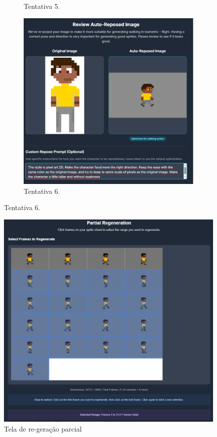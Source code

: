 \begin{figure}[htbp]
\begin{subfigure}{0.45\linewidth}
        \caption{\small Tentativa 5.}
        \label{fig:godmodAIrepose5}
    \end{subfigure}
        \begin{subfigure}{0.45\linewidth}
        \includegraphics[width=1\linewidth]{figs/godmodAI/tela auto repose 6.PNG}
        \caption{\small Tentativa 6.}
        \label{fig:godmodAIrepose6}
    \end{subfigure}
\end{figure}

\begin{figure}[htbp]
    \centering
    \caption{\small Tela de re-geração parcial}
    \label{fig:godmodAIregen}
    \includegraphics[width=1\linewidth]{figs/godmodAI/regeracao_parcial.PNG}
\end{figure}